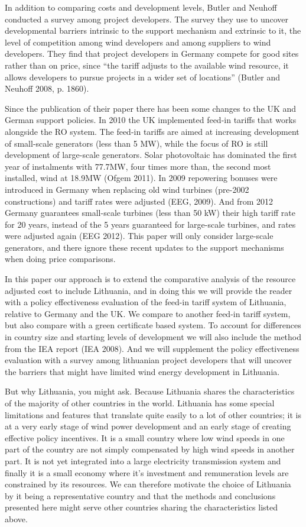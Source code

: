 \documentclass[a4paper, 12pt]{article}
\begin{document}
In addition to comparing costs and development levels, Butler and Neuhoff conducted a survey among project developers. The survey they use to uncover developmental barriers intrinsic to the support mechanism and extrinsic to it, the level of competition among wind developers and among suppliers to wind developers. They find that project developers in Germany compete for good sites rather than on price, since ``the tariff adjusts to the available wind resource, it allows developers to pursue projects in a wider set of locations'' (Butler and Neuhoff 2008, p. 1860).

Since the publication of their paper there has been some changes to the UK and German support policies. In 2010 the UK implemented feed-in tariffs that works alongside the RO system. The feed-in tariffs are aimed at increasing development of small-scale generators (less than 5 MW), while the focus of RO is still development of large-scale generators. Solar photovoltaic has dominated the first year of instalments with 77.7MW, four times more than, the second most installed, wind at 18.9MW (Ofgem 2011). In 2009 repowering bonuses were introduced in Germany when replacing old wind turbines (pre-2002 constructions) and tariff rates were adjusted (EEG, 2009). And from 2012 Germany guarantees small-scale turbines (less than 50 kW) their high tariff rate for 20 years, instead of the 5 years guaranteed for large-scale turbines, and rates were adjusted again (EEG 2012). This paper will only consider large-scale generators, and there ignore these recent updates to the support mechanisms when doing price comparisons.

In this paper our approach is to extend the comparative analysis of the resource adjusted cost to include Lithuania, and in doing this we will provide the reader with a policy effectiveness evaluation of the feed-in tariff system of Lithuania, relative to Germany and the UK. We compare to another feed-in tariff system, but also compare with a green certificate based system. To account for differences in country size and starting levels of development we will also include the method from the IEA report (IEA 2008). And we will supplement the policy effectiveness evaluation with a survey among lithuanian project developers that will uncover the barriers that might have limited wind energy development in Lithuania. 

But why Lithuania, you might ask. Because Lithuania shares the characteristics of the majority of other countries in the world. Lithuania has some special limitations and features that translate quite easily to a lot of other countries; it is at a very early stage of wind power development and an early stage of creating effective policy incentives. It is a small country where low wind speeds in one part of the country are not simply compensated by high wind speeds in another part. It is not yet integrated into a large electricity transmission system and finally it is a small economy where it’s investment and remuneration levels are constrained by its resources. We can therefore motivate the choice of Lithuania by it being a representative country and that the methods and conclusions presented here might serve other countries sharing the characteristics listed above.
\end{document}
